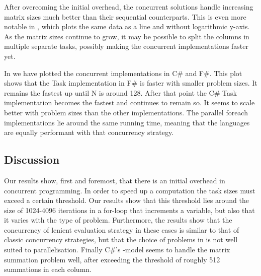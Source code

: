 After overcoming the initial overhead, the concurrent solutions handle increasing matrix sizes much better than their sequential counterparts. This is even more notable in , which plots the same data as a line and without logarithmic y-axis. As the matrix sizes continue to grow, it may be possible to split the columns in multiple separate tasks, possibly making the concurrent implementations faster yet.


In  we have plotted the concurrent implementations in C\# and F\#. This plot shows that the Task implementation in F\# is faster with smaller problem sizes. It remains the fastest up until N is around 128. After that point the C\# Task implementation becomes the fastest and continues to remain so. It seems to scale better with problem sizes than the other implementations. The parallel foreach implementations lie around the same running time, meaning that the languages are equally performant with that concurrency strategy.

\subsection{Discussion}\label{sec:crit-work-dis}
Our results show, first and foremost, that there is an initial overhead in concurrent programming. In order to speed up a computation the task sizes must exceed a certain threshold. Our results show that this threshold lies around the size of 1024-4096 iterations in a for-loop that increments a variable, but also that it varies with the type of problem. Furthermore, the results show that the concurrency of lenient evaluation strategy in these cases is similar to that of classic concurrency strategies, but that the choice of problems in \cite{DBLP:journals/cl/Tremblay-parallel} is not well suited to parallelisation. Finally C\#'s -model seems to handle the matrix summation problem well, after exceeding the threshold of roughly 512 summations in each column.

